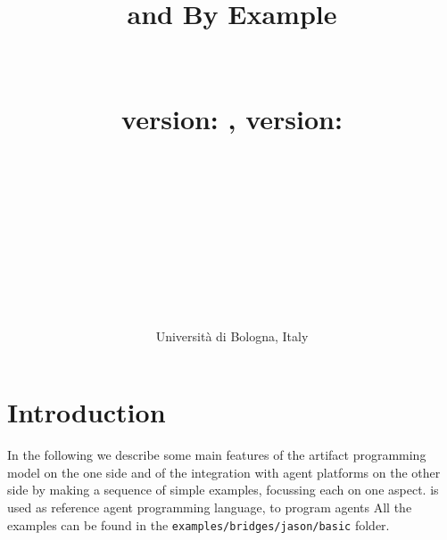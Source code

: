 \documentclass[11pt]{report}
\title{{\huge{\bf{{\cartago} and {\jaca} By Example}}\\~\\~\\}
{\large{
   {\cartago} version: \cartagoversion, {\jason} version: \jasonversion \\~\\~\\}}
{\small{
   \repauthor{aricci, asanti}  \\  
    \creationdate{20100801}\\
    \lastchangesdate{20121116}\\
    }}
}
\author{Universit\`{a} di Bologna, Italy}
\date{}
\newcommand{\jason}{\mbox{\sf{\emph{{Jason}}}}}
\begin{document}
\maketitle
\sloppy

\tableofcontents

\chapter{Introduction}

In the following we describe some main features of the artifact programming model on the one side and of the integration with agent platforms on the other side by making a sequence of simple examples, focussing each on one aspect.
%
{\jason} is used as reference agent programming language, to program agents
%
All the examples can be found in the \texttt{examples/bridges/jason/basic} folder.
\end{document}
